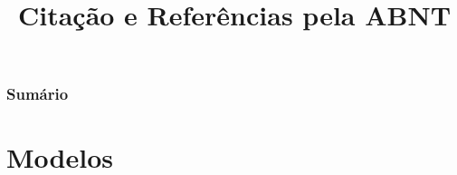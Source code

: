 \documentclass[a4paper]{beamer}
\title{Citação e Referências pela ABNT}
\begin{document}
    \frame{\titlepage}

    \begin{frame}
        \frametitle{Sumário}
        \tableofcontents
    \end{frame}

\section{Modelos }
\end{document}

